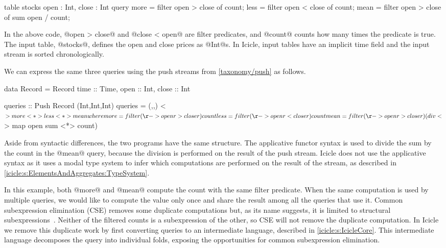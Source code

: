 \begin{icicle}
table stocks { open : Int, close : Int }
query 
  more = filter open > close of count;
  less = filter open < close of count;
  mean = filter open > close of sum open / count;
\end{icicle}

In the above code, @open > close@ and @close < open@ are filter predicates, and @count@ counts how many times the predicate is true.
The input table, @stocks@, defines the open and close prices as @Int@s.
In Icicle, input tables have an implicit time field and the input stream is sorted chronologically.

We can express the same three queries using the push streams from \cref{taxonomy/push} as follows.

\begin{haskell}
data Record = Record
 { time :: Time, open :: Int, close :: Int }

queries :: Push Record (Int,Int,Int)
queries = (,,) <$> more <*> less <*> mean
 where
  more = filter (\r -> open r > close r) count
  less = filter (\r -> open r < close r) count
  mean = filter (\r -> open r > close r) (div <$> map open sum <*> count)
\end{haskell}

Aside from syntactic differences, the two programs have the same structure.
The applicative functor syntax is used to divide the sum by the count in the @mean@ query, because the division is performed on the result of the push stream.
Icicle does not use the applicative syntax as it uses a modal type system to infer which computations are performed on the result of the stream, as described in \cref{icicle:s:ElementsAndAggregates:TypeSystem}.

In this example, both @more@ and @mean@ compute the count with the same filter predicate.
When the same computation is used by multiple queries, we would like to compute the value only once and share the result among all the queries that use it.
Common subexpression elimination (CSE) removes some duplicate computations but, as its name suggests, it is limited to structural subexpressions~\cite{chitil1997uncommon}.
Neither of the filtered counts is a subexpression of the other, so CSE will not remove the duplicate computation.
In Icicle we remove this duplicate work by first converting queries to an intermediate language, described in \cref{icicle:s:IcicleCore}.
This intermediate language decomposes the query into individual folds, exposing the opportunities for common subexpression elimination.

